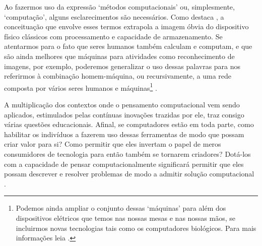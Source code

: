 Ao fazermos uso da expressão `métodos computacionais' ou, simplesmente, `computação', alguns esclarecimentos são necessários. Como destaca , a conceituação que envolve esses termos extrapola a imagem óbvia do dispositivo físico clássicos com processamento e capacidade de armazenamento. Se atentarmos para o fato que seres humanos também calculam e computam, e que são ainda melhores que máquinas para atividades como reconhecimento de imagens, por exemplo, poderemos generalizar o uso dessas palavras para nos referirmos à combinação homem-máquina, ou recursivamente, a uma rede composta por vários seres humanos e máquinas\footnote{Podemos ainda ampliar o conjunto dessas `máquinas' para além dos dispositivos elétricos que temos nas nossas mesas e nas nossas mãos, se incluirmos novas tecnologias tais como os computadores biológicos. Para mais informações leia .} \cite{wing2008,Wing2010}.

A multiplicação dos contextos onde o pensamento computacional vem sendo aplicados, estimulados pelas contínuas inovações trazidas por ele, traz consigo várias questões educacionais. Afinal, se computadores estão em toda parte, como habilitar os indivíduos a fazerem uso dessas ferramentas de modo que possam criar valor para si? Como permitir que eles invertam o papel de meros consumidores de tecnologia para então também se tornarem criadores? Dotá-los com a capacidade de pensar computacionalmente significará permitir que eles possam descrever e resolver problemas de modo a admitir solução computacional \cite{Wing2010}. 




